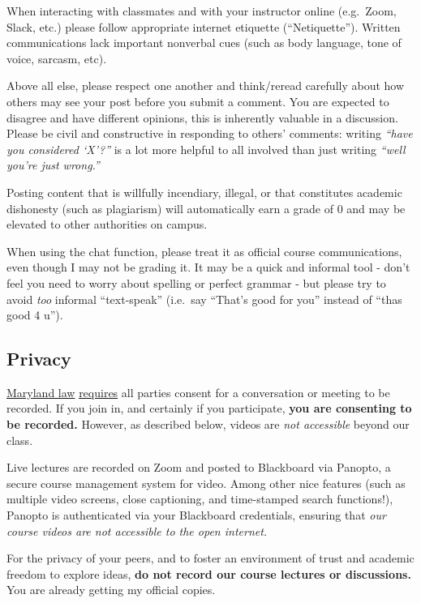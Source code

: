 \documentclass{article}
\begin{document}
When interacting with classmates and with your instructor online
(e.g.~Zoom, Slack, etc.) please follow appropriate internet etiquette
(``Netiquette''). Written communications lack important nonverbal cues
(such as body language, tone of voice, sarcasm, etc).

Above all else, please respect one another and think/reread carefully
about how others may see your post before you submit a comment. You are
expected to disagree and have different opinions, this is inherently
valuable in a discussion. Please be civil and constructive in responding
to others' comments: writing \emph{``have you considered `X'?''} is a
lot more helpful to all involved than just writing \emph{``well you're
just wrong.''}

Posting content that is willfully incendiary, illegal, or that
constitutes academic dishonesty (such as plagiarism) will automatically
earn a grade of 0 and may be elevated to other authorities on campus.

When using the chat function, please treat it as official course
communications, even though I may not be grading it. It may be a quick
and informal tool - don't feel you need to worry about spelling or
perfect grammar - but please try to avoid \emph{too} informal
``text-speak'' (i.e.~say ``That's good for you'' instead of ``thas good
4 u'').

\hypertarget{privacy}{%
\subsection{Privacy}\label{privacy}}

\href{https://www.execvision.io/blog/maryland-call-recording-laws/}{Maryland
law}
\href{https://law.justia.com/codes/maryland/2005/gcj/10-402.html}{requires}
all parties consent for a conversation or meeting to be recorded. If you
join in, and certainly if you participate, \textbf{you are consenting to
be recorded.} However, as described below, videos are \emph{not
accessible} beyond our class.

Live lectures are recorded on Zoom and posted to Blackboard via Panopto,
a secure course management system for video. Among other nice features
(such as multiple video screens, close captioning, and time-stamped
search functions!), Panopto is authenticated via your Blackboard
credentials, ensuring that \emph{our course videos are not accessible to
the open internet.}

For the privacy of your peers, and to foster an environment of trust and
academic freedom to explore ideas, \textbf{do not record our course
lectures or discussions.} You are already getting my official copies.
\end{document}
